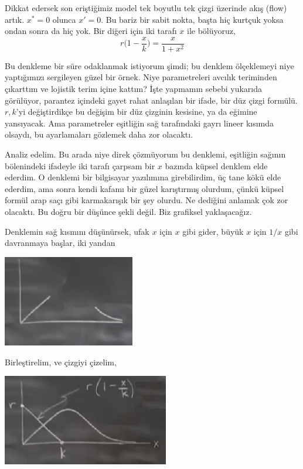 \documentclass[12pt,fleqn]{article}\usepackage{../../common}
\begin{document}
Dikkat edersek son eriştiğimiz model tek boyutlu tek çizgi üzerinde akış
(flow) artık. $x^*=0$ olunca $x'=0$. Bu bariz bir sabit nokta, başta hiç kurtçuk
yoksa ondan sonra da hiç yok. Bir diğeri için iki tarafı $x$ ile bölüyoruz,
%
$$ r \bigg(1-\frac{x}{k}\bigg) = \frac{x}{1+x^2} $$

Bu denkleme bir süre odaklanmak istiyorum şimdi; bu denklem ölçeklemeyi
niye yaptığımızı sergileyen güzel bir örnek. Niye parametreleri avcılık
teriminden çıkarttım ve lojistik terim içine kattım? İşte yapmamın sebebi
yukarıda görülüyor, parantez içindeki gayet rahat anlaşılan bir ifade, bir düz
çizgi formülü. $r,k$'yi değiştirdikçe bu değişim bir düz çizginin kesisine, ya da
eğimine yansıyacak. Ama parametreler eşitliğin sağ tarafındaki gayrı lineer
kısımda olsaydı, bu ayarlamaları gözlemek daha zor olacaktı. 

Analiz edelim. Bu arada niye direk çözmüyorum bu denklemi, eşitliğin sağının
bölenindeki ifadeyle iki tarafı çarpsam bir $x$ bazında küpsel denklem elde
ederdim. O denklemi bir bilgisayar yazılımına girebilirdim, üç tane kökü elde
ederdim, ama sonra kendi kafamı bir güzel karıştırmış olurdum, çünkü küpsel
formül arap saçı gibi karmakarışık bir şey olurdu. Ne dediğini anlamak çok zor
olacaktı. Bu doğru bir düşünce şekli değil. Biz grafiksel yaklaşacağız.

Denklemin sağ kısmını düşünürsek, ufak $x$ için $x$ gibi gider, büyük $x$ için
$1/x$ gibi davranmaya başlar, iki yandan

\includegraphics[height=4cm]{04_03.png}

Birleştirelim, ve çizgiyi çizelim, 

\includegraphics[height=4cm]{04_04.png}
\end{document}

